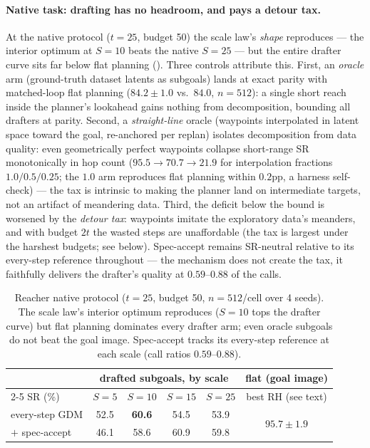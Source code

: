 \documentclass{article}
\newcommand{\ours}[1]{\textbf{#1}}          %
\newcommand{\gdm}{\text{GDM}}
\begin{document}
\paragraph{Native task: drafting has no headroom, and pays a detour tax.}
At the native protocol ($t{=}25$, budget 50) the scale law's \emph{shape} reproduces
--- the interior optimum at $S{=}10$ beats the native $S{=}25$ --- but the entire
drafter curve sits far below flat planning (). Three controls
attribute this. First, an \emph{oracle} arm (ground-truth dataset latents as subgoals)
lands at exact parity with matched-loop flat planning ($84.2\pm1.0$ vs.\ $84.0$,
$n{=}512$): a single short reach inside the planner's lookahead gains nothing from
decomposition, bounding all drafters at parity. Second, a \emph{straight-line} oracle
(waypoints interpolated in latent space toward the goal, re-anchored per replan)
isolates decomposition from data quality: even geometrically perfect waypoints collapse
short-range SR monotonically in hop count ($95.5 \to 70.7 \to 21.9$ for interpolation
fractions $1.0/0.5/0.25$; the $1.0$ arm reproduces flat planning within $0.2$pp, a
harness self-check) --- the tax is intrinsic to making the planner land on intermediate
targets, not an artifact of meandering data. Third, the deficit below the bound is
worsened by the \emph{detour tax}: waypoints
imitate the exploratory data's meanders, and with budget $2t$ the wasted steps are
unaffordable (the tax is largest under the harshest budgets; see below). Spec-accept
remains SR-neutral relative to its every-step reference throughout --- the mechanism
does not create the tax, it faithfully delivers the drafter's quality at $0.59$--$0.88$
of the calls.

\begin{table}[h]
\centering
\small
\setlength{\tabcolsep}{5pt}
\caption{Reacher native protocol ($t{=}25$, budget 50, $n{=}512$/cell over 4 seeds).
The scale law's interior optimum reproduces ($S{=}10$ tops the drafter curve) but flat
planning dominates every drafter arm; even oracle subgoals do not beat the goal image.
Spec-accept tracks its every-step reference at each scale (call ratios $0.59$--$0.88$).}
\label{tab:reacher-native}
\begin{tabular}{lccccc}
\toprule
& \multicolumn{4}{c}{drafted subgoals, by scale} & flat (goal image) \\
\cmidrule(lr){2-5}
SR (\%) & $S{=}5$ & $S{=}10$ & $S{=}15$ & $S{=}25$ & best RH (see text) \\
\midrule
every-step $\gdm$ & 52.5 & \ours{60.6} & 54.5 & 53.9 & \multirow{2}{*}{$95.7\pm1.9$} \\
$+$ spec-accept   & 46.1 & 58.6 & 60.9 & 59.8 & \\
\bottomrule
\end{tabular}
\end{table}
\end{document}
